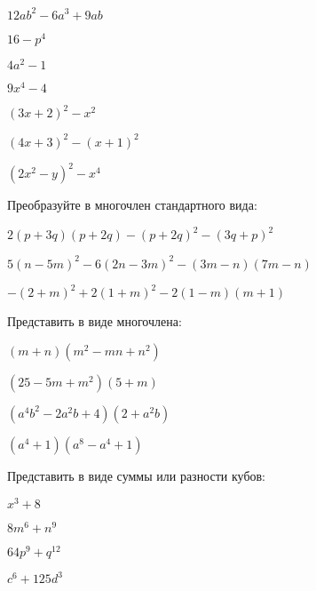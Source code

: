 \begin{listofex}
\begin{enumcols}[itemcolumns=3]
		\item \( 12ab^2-6a^3+9ab \)
		\item \( 16-p^4 \)
		\item \( 4a^2-1 \)
		\item \( 9x^4-4 \)
		\item \( (3x+2)^2-x^2 \)
		\item \( (4x+3)^2-(x+1)^2 \)
		\item \( (2x^2-y)^2-x^4 \)
	\end{enumcols}
	\item Преобразуйте в многочлен стандартного вида:
	\begin{enumcols}[itemcolumns=1]
		\item \( 2(p+3q)(p+2q)-(p+2q)^2-(3q+p)^2 \)
		\item \( 5(n-5m)^2-6(2n-3m)^2-(3m-n)(7m-n) \)
		\item \( -(2+m)^2+2(1+m)^2-2(1-m)(m+1) \)
	\end{enumcols}
	\item Представить в виде многочлена:
	\begin{enumcols}[itemcolumns=2]
		\item \( (m+n)(m^2-mn+n^2) \)
		\item \( (25-5m+m^2)(5+m) \)
		\item \( (a^4b^2-2a^2b+4)(2+a^2b) \)
		\item \( (a^4+1)(a^8-a^4+1) \)
	\end{enumcols}
	\item Представить в виде суммы или разности кубов:
	\begin{enumcols}[itemcolumns=4]
		\item \( x^3+8 \)
		\item \( 8m^6+n^9 \)
		\item \( 64p^9+q^{12} \)
		\item \( c^6+125d^3 \)
	\end{enumcols}
\end{listofex}
%	
%	
%	
%	
%	
%	
